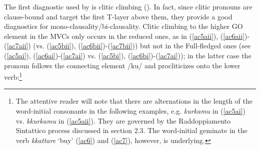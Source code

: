 \documentclass[output=paper]{langscibook}
\begin{document}
The first diagnostic used by \citet{cardinaletti2003a} is clitic climbing (\citealt{rizzi1976a}). In fact, since clitic pronouns are clause-bound and target the first T-layer above them, they provide a good diagnostics for mono-clausality/bi-clausality. Clitic climbing to the higher GO element in the MVCs only occurs in the reduced ones, as in (\ref{ac5aii}), (\ref{ac6aii})-(\ref{ac7aii}) (vs. (\ref{ac5bii}), (\ref{ac6bii})-(\ref{ac7bii})) but not in the Full-fledged ones (see (\ref{ac5ai}), (\ref{ac6ai})-(\ref{ac7ai}) vs. (\ref{ac5bi}), (\ref{ac6bi})-(\ref{ac7ai})); in the latter case the pronoun follows the connecting element /ku/ and procliticizes onto the lower verb:\footnote{The attentive reader will note that there are alternations in the length of the word-initial consonants in the following examples, e.g. \textit{kurkamu} in (\ref{ac5ai}) vs. \textit{kkurkamu} in (\ref{ac5aii}).  They are governed by the Raddoppiamento Sintattico process discussed in section 2.3.  The word-initial geminate in the verb \textit{kkattare} ‘buy’ (\ref{ac6}) and (\ref{ac7}), however, is underlying.}
\end{document}
